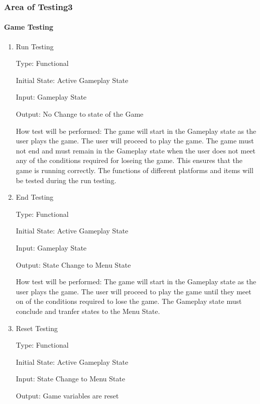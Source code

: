 \documentclass[12pt, titlepage]{article}
\begin{document}
\subsubsection{Area of Testing3}
		
\paragraph{Game Testing}

\begin{enumerate}

\item{Run Testing\\}

Type: Functional
					
Initial State: Active Gameplay State
					
Input: Gameplay State
					
Output: No Change to state of the Game
					
How test will be performed: The game will start in the Gameplay state as the user plays the game. The user will proceed to play the game. The game must not end and must remain in the Gameplay state when the user does not meet any of the conditions required for loseing the game. This ensures that the game is running correctly. The functions of different platforms and items will be tested during the run testing.
					
					
\item{End Testing\\}

Type: Functional
					
Initial State: Active Gameplay State
					
Input: Gameplay State
					
Output: State Change to Menu State
					
How test will be performed: The game will start in the Gameplay state as the user plays the game. The user will proceed to play the game until they meet on of the conditions required to lose the game. The Gameplay state must conclude and tranfer states to the Menu State. 

\item{Reset Testing\\}

Type: Functional
					
Initial State: Active Gameplay State
					
Input: State Change to Menu State
					
Output: Game variables are reset
					

\end{enumerate}
\end{document}
